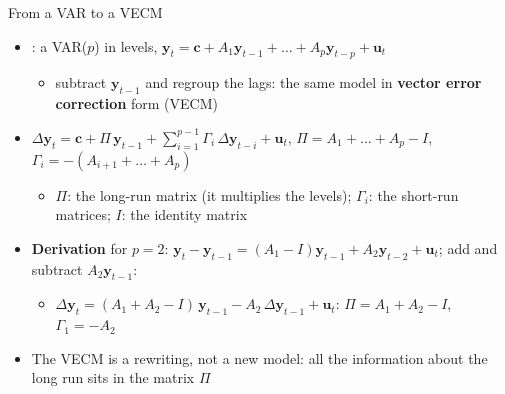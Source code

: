 \begin{frame}{From a VAR to a VECM}
\itemsize{\small}
\begin{itemize}
    \item {}: a VAR($p$) in levels, $\mathbf y_t = \mathbf c + A_1\mathbf y_{t-1} + \dots + A_p\mathbf y_{t-p} + \mathbf u_t$
    \begin{itemize}
        \item subtract $\mathbf y_{t-1}$ and regroup the lags: the same model in \textbf{vector error correction} form (VECM)
    \end{itemize}
    \item $\Delta\mathbf y_t = \mathbf c + \Pi\,\mathbf y_{t-1} + \sum_{i=1}^{p-1}\Gamma_i\,\Delta\mathbf y_{t-i} + \mathbf u_t$, \quad $\Pi = A_1 + \dots + A_p - I$, \quad $\Gamma_i = -(A_{i+1} + \dots + A_p)$
    \begin{itemize}
        \item $\Pi$: the long-run matrix (it multiplies the levels); $\Gamma_i$: the short-run matrices; $I$: the identity matrix
    \end{itemize}
    \item \textbf{Derivation} for $p = 2$: $\mathbf y_t - \mathbf y_{t-1} = (A_1 - I)\mathbf y_{t-1} + A_2\mathbf y_{t-2} + \mathbf u_t$; add and subtract $A_2\mathbf y_{t-1}$:
    \begin{itemize}
        \item $\Delta\mathbf y_t = (A_1 + A_2 - I)\,\mathbf y_{t-1} - A_2\,\Delta\mathbf y_{t-1} + \mathbf u_t$: $\Pi = A_1 + A_2 - I$, $\Gamma_1 = -A_2$
    \end{itemize}
    \item The VECM is a rewriting, not a new model: all the information about the long run sits in the matrix $\Pi$
\end{itemize}
\end{frame}

